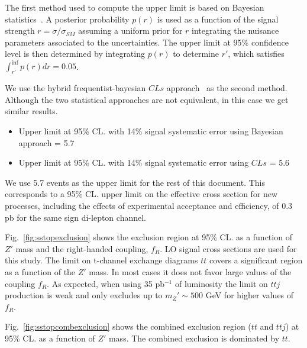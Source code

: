 The first method used to compute the upper limit is based on Bayesian statistics~\cite{bayesian}.
A posterior probability $p(r)$ is used as a function of the signal strength $r = \sigma/\sigma_{SM}$ 
assuming a uniform prior for $r$ integrating the nuisance parameters associated to the uncertainties.
The upper limit at 95\% confidence level is then determined by integrating $p(r)$ to determine $r'$, 
which satisfies $\int_{r'}^{\inf} p(r) dr = 0.05$.

We use the hybrid frequentist-bayesian $CLs$ approach~\cite{CLS} as the second method. 
Although the two statistical approaches are not equivalent, in this case we get similar results. 

\begin{itemize}
\item Upper limit at 95\% CL. with 14\% signal systematic error using Bayesian approach = 5.7  
\item Upper limit at 95\% CL. with 14\% signal systematic error using $CLs$ = 5.6  
\end{itemize}

We use 5.7 events as the upper limit for the rest of this document. 
This corresponds to a 95\% CL. upper limit on the effective cross section for new processes, 
including the effects of experimental acceptance and efficiency, of 0.3 pb for the same sign di-lepton channel.

Fig.~\ref{fig:sstopexclusion} shows the exclusion region at 95\% CL. as a function of $Z'$ mass and the right-handed coupling, $f_R$. 
LO signal cross sections are used for this study. 
The limit on t-channel exchange diagrams $tt$ covers a significant region as a function of the $Z'$ mass.
In most cases it does not favor large values of the coupling $f_R$. 
As expected, when using 35 pb$^{-1}$ of luminosity the limit on $ttj$ production is weak and 
only excludes up to $m_Z' \sim 500$ GeV for higher values of $f_R$. 

Fig.~\ref{fig:sstopcombexclusion} shows the combined exclusion region ($tt$ and $ttj$) at 
95\% CL. as a function of $Z'$ mass.  The combined exclusion is dominated by $tt$.

